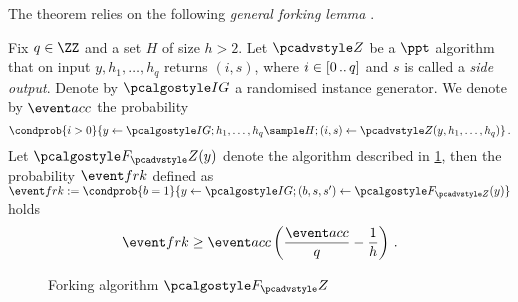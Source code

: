 \documentclass[runningheads,11pt]{llncs}
\begin{document}
The theorem relies on the following \emph{general forking lemma} \cite{JC:PoiSte00}.

\begin{lemma}
	\label{lem:forking_lemma}
	Fix $q \in \ZZ$ and a set $H$ of size $h > 2$. Let $\zdv$ be a $\ppt$
  algorithm that on input $y, h_1, \ldots, h_q$ returns $(i, s)$, where $i
  \in[0 \, .. \, q]$ and $s$ is called a \emph{side output}. Denote by $\ig$ a
  randomised instance generator. We denote by $\accProb$ the probability
	\[
		\condprob{i > 0}{y \gets \ig; h_1, \ldots, h_q \sample H; (i, s) \gets
		\zdv(y, h_1, \ldots, h_q)}\,.
	\]
	Let $\forking_\zdv(y)$ denote the algorithm described in
  \cref{fig:forking_lemma}, then the probability $\frkProb$ defined as $
  \frkProb := \condprob{b = 1}{y \gets \ig; (b, s, s') \gets \forking_{\zdv}(y)}
  $ holds
	\[
		\frkProb \geq \accProb \brak{\frac{\accProb}{q} - \frac{1}{h}}\,.
	\]
	\begin{figure}[t]
		\centering
		\caption{Forking algorithm $\forking_\zdv$}
		\label{fig:forking_lemma}
\end{figure}
\end{lemma}
\end{document}
